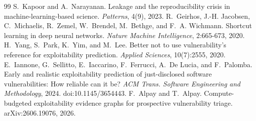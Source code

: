 \documentclass[conference,a4paper]{IEEEtran}
\begin{document}
\begin{thebibliography}{99}
 S.~Kapoor and A.~Narayanan. Leakage and the reproducibility crisis in machine-learning-based science. \emph{Patterns}, 4(9), 2023.
 R.~Geirhos, J.-H. Jacobsen, C.~Michaelis, R.~Zemel, W.~Brendel, M.~Bethge, and F.~A. Wichmann. Shortcut learning in deep neural networks. \emph{Nature Machine Intelligence}, 2:665-673, 2020.
 H.~Yang, S.~Park, K.~Yim, and M.~Lee. Better not to use vulnerability's reference for exploitability prediction. \emph{Applied Sciences}, 10(7):2555, 2020.
 E.~Iannone, G.~Sellitto, E.~Iaccarino, F.~Ferrucci, A.~De Lucia, and F.~Palomba. Early and realistic exploitability prediction of just-disclosed software vulnerabilities: How reliable can it be? \emph{ACM Trans. Software Engineering and Methodology}, 2024. doi:10.1145/3654443.
 F.~Alpay and T.~Alpay. Compute-budgeted exploitability evidence graphs for prospective vulnerability triage. arXiv:2606.19076, 2026.
\end{thebibliography}
\end{document}

